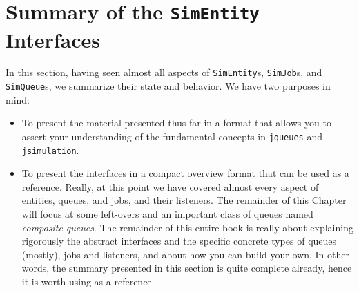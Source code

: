 \section{Summary of the \texttt{SimEntity} Interfaces}
\label{sec:guided:simentity-model}

In this section,
having seen almost all aspects of \lstinline|SimEntity|s,
\lstinline|SimJob|s,
and \lstinline|SimQueue|s,
we summarize their state and behavior.
We have two purposes in mind:
\begin{itemize}
	\item To present the material presented thus far in a format
	that allows you to assert your understanding
	of the fundamental concepts in \lstinline|jqueues|
	and \lstinline|jsimulation|.
	\item To present the interfaces in a compact overview format
	that can be used as a reference.
	Really, at this point we have covered almost every aspect
	of entities, queues, and jobs, and their listeners.
	The remainder of this Chapter will focus at some
	left-overs and an important class of queues
	named {\em composite queues}.
	The remainder of this entire book is really
	about explaining rigorously the abstract interfaces
	and the specific concrete types
	of queues (mostly), jobs and listeners,
	and about how you can build your own.
	In other words, the summary presented in this section
	is quite complete already,
	hence it is worth using as a reference.
\end{itemize}
